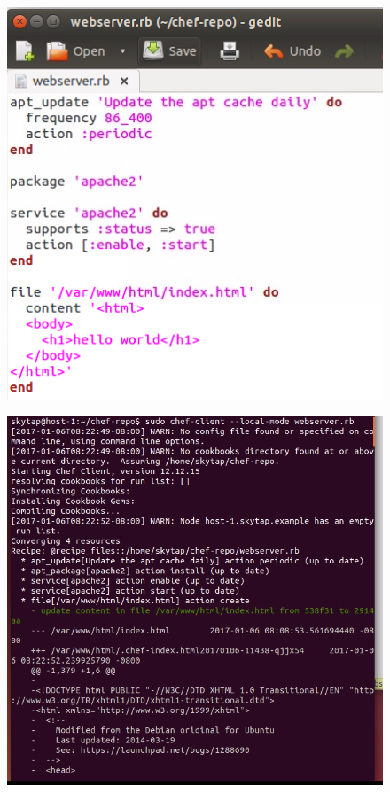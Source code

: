 \documentclass[12pt,letterpaper,boxed]{hmcpset}
\begin{document}
\begin{figure}[H]
  \centering
  \includegraphics[width = 1.0\textwidth]{19.png}
\end{figure}
\begin{figure}[H]
  \centering
  \includegraphics[width = 1.0\textwidth]{20.png}
\end{figure}
\end{document}
